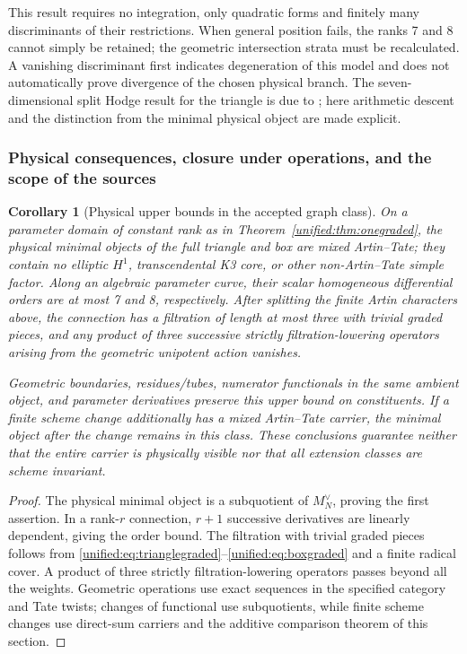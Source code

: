 \documentclass[11pt,a4paper,oneside]{article}
\theoremstyle{plain}
\newtheorem{corollary}[theorem]{Corollary}
\theoremstyle{definition}
\theoremstyle{remark}
\numberwithin{equation}{section}
\begin{document}
This result requires no integration, only quadratic forms and finitely many discriminants of their restrictions.
When general position fails, the ranks 7 and 8 cannot simply be retained; the geometric intersection strata must be recalculated.
A vanishing discriminant first indicates degeneration of this model and does not automatically prove divergence of the chosen physical branch.
The seven-dimensional split Hodge result for the triangle is due to \cite[Proposition10.1]{bkone};
here arithmetic descent and the distinction from the minimal physical object are made explicit.

\subsubsection{Physical consequences, closure under operations, and the scope of the sources}
\begin{corollary}[Physical upper bounds in the accepted graph class]\label{unified:cor:oneoperations}
On a parameter domain of constant rank as in Theorem~\ref{unified:thm:onegraded}, the physical minimal objects of the full triangle and box
are mixed Artin--Tate; they contain no elliptic $H^1$, transcendental K3 core, or other non-Artin--Tate simple factor.
Along an algebraic parameter curve, their scalar homogeneous differential orders are at most 7 and 8, respectively.
After splitting the finite Artin characters above, the connection has a filtration of length at most three with trivial graded pieces,
and any product of three successive strictly filtration-lowering operators arising from the geometric unipotent action vanishes.

Geometric boundaries, residues/tubes, numerator functionals in the same ambient object, and parameter derivatives preserve this upper bound on constituents.
If a finite scheme change additionally has a mixed Artin--Tate carrier, the minimal object after the change remains in this class.
These conclusions guarantee neither that the entire carrier is physically visible nor that all extension classes are scheme invariant.
\end{corollary}
\begin{proof}
The physical minimal object is a subquotient of $M_N^\vee$, proving the first assertion.
In a rank-$r$ connection, $r+1$ successive derivatives are linearly dependent, giving the order bound.
The filtration with trivial graded pieces follows from \eqref{unified:eq:trianglegraded}--\eqref{unified:eq:boxgraded} and a finite radical cover.
A product of three strictly filtration-lowering operators passes beyond all the weights.
Geometric operations use exact sequences in the specified category and Tate twists;
changes of functional use subquotients, while finite scheme changes use direct-sum carriers and the additive comparison theorem of this section.
\end{proof}
\end{document}
